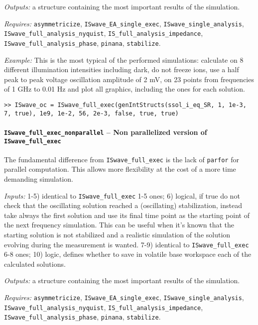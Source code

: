 \textit{Outputs:} a structure containing the most important results of the simulation.

\textit{Requires:} \texttt{asymmetricize}, \texttt{ISwave\_EA\_single\_exec},
   \texttt{ISwave\_single\_analysis}, \texttt{ISwave\_full\_analysis\_nyquist},
   \texttt{IS\_full\_analysis\_impedance}, \texttt{ISwave\_full\_analysis\_phase}, \texttt{pinana},
   \texttt{stabilize}.


\textit{Example:} This is the most typical of the performed simulations: calculate on 8 different illumination intensities including dark, do not freeze ions, use a half peak to peak
     voltage oscillation amplitude of 2 mV, on 23 points from frequencies of 1 GHz to
     0.01 Hz and plot all graphics, including the ones for each solution.
\begin{lstlisting}[style=Matlab-editor]
>> ISwave_oc = ISwave_full_exec(genIntStructs(ssol_i_eq_SR, 1, 1e-3, 7, true), 1e9, 1e-2, 56, 2e-3, false, true, true)
\end{lstlisting}

\paragraph{\texttt{ISwave\_full\_exec\_nonparallel} -- Non parallelized version of \texttt{ISwave\_full\_exec}}
The fundamental difference from \texttt{ISwave\_full\_exec} is the lack of \texttt{parfor}
 for parallel computation. This allows more flexibility at the cost of a
 more time demanding simulation.

\textit{Inputs:} 1-5) identical to \texttt{ISwave\_full\_exec} 1-5 ones;
6) logical, if true do not check that the oscillating solution reached a
     (oscillating) stabilization, instead take always the first solution
     and use its final time point as the starting point of the next
     frequency simulation. This can be useful when it's known that the
     starting solution is not stabilized and a realistic simulation of the
     solution evolving during the measurement is wanted.
7-9) identical to \texttt{ISwave\_full\_exec} 6-8 ones;
10) logic, defines whether to save in volatile base
    workspace each of the calculated solutions.
    
\textit{Outputs:} a structure containing the most important results of the simulation.

\textit{Requires:} \texttt{asymmetricize}, \texttt{ISwave\_EA\_single\_exec},
\texttt{ISwave\_single\_analysis}, \texttt{ISwave\_full\_analysis\_nyquist},
\texttt{IS\_full\_analysis\_impedance}, \texttt{ISwave\_full\_analysis\_phase}, \texttt{pinana},
\texttt{stabilize}.

